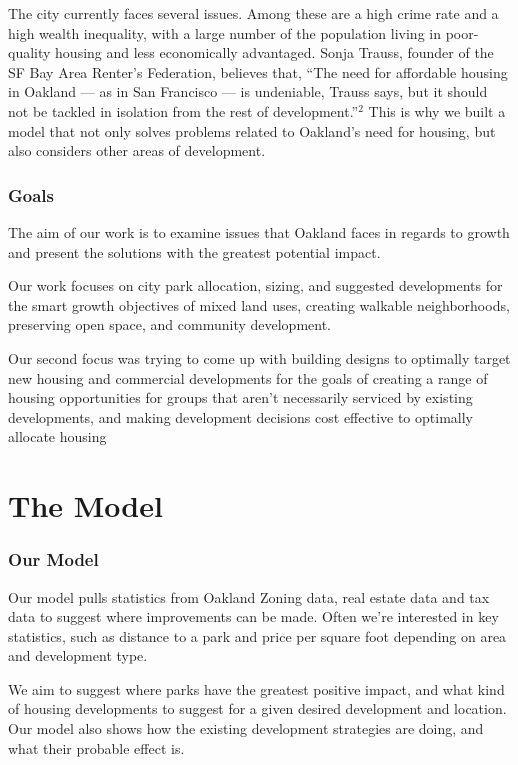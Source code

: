 \documentclass[]{report}
\begin{document}
	The city currently faces several issues. Among these are a high crime rate and a high wealth inequality, with a large number of the population living in poor-quality housing and less economically advantaged. Sonja Trauss, founder of the SF Bay Area Renter’s Federation, believes that, “The need for affordable housing in Oakland — as in San Francisco — is undeniable, Trauss says, but it should not be tackled in isolation from the rest of development.”$^{2}$ This is why we built a model that not only solves problems related to Oakland's need for housing, but also considers other areas of development.
		
	\section{Goals}

	The aim of our work is to examine issues that Oakland faces in regards to growth and present the solutions with the greatest potential impact.
	
	Our work focuses on city park allocation, sizing, and suggested developments for the smart growth objectives of mixed land uses, creating walkable neighborhoods, preserving open space, and community development.
	
	Our second focus was trying to come up with building designs to optimally target new housing and commercial developments for the goals of creating a range of housing opportunities for groups that aren't necessarily serviced by existing developments, and making development decisions cost effective to optimally allocate housing
	
	
\part{The Model}
	\section{Our Model}
	Our model pulls statistics from Oakland Zoning data, real estate data and tax data to suggest where improvements can be made. Often we're interested in key statistics, such as distance to a park and price per square foot depending on area and development type.
	
	We aim to suggest where parks have the greatest positive impact, and what kind of housing developments to suggest for a given desired development and location. Our model also shows how the existing development strategies are doing, and what their probable effect is.
	
\end{document}
